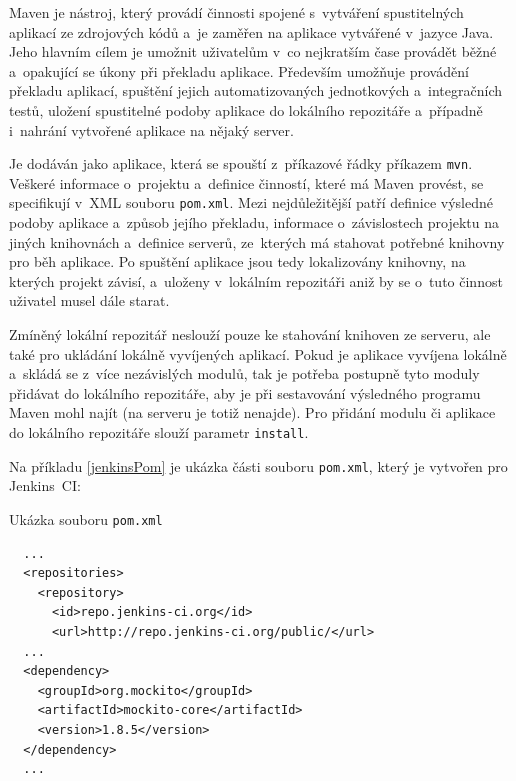         Maven je nástroj, který provádí činnosti spojené s~vytváření spustitelných aplikací ze zdrojových kódů
        a~je zaměřen na aplikace vytvářené v~jazyce Java. Jeho hlavním cílem je umožnit uživatelům v~co nejkratším
        čase provádět běžné a~opakující se úkony při překladu aplikace. Především umožňuje
        provádění překladu aplikací, spuštění jejich automatizovaných jednotkových
        a~integračních testů, uložení spustitelné podoby aplikace do lokálního repozitáře 
        a~případně i~nahrání vytvořené aplikace na nějaký server. 

        Je dodáván jako aplikace, která se spouští z~příkazové řádky příkazem \texttt{mvn}. Veškeré
        informace o~projektu a~definice činností, které má Maven provést, se specifikují
        v~XML souboru \texttt{pom.xml}. Mezi nejdůležitější patří definice výsledné podoby aplikace
        a~způsob jejího překladu, informace o~závislostech
        projektu na jiných knihovnách a~definice serverů, ze~kterých má stahovat potřebné knihovny pro běh aplikace. 
        Po spuštění aplikace jsou tedy lokalizovány knihovny, na kterých projekt
        závisí, a~uloženy v~lokálním repozitáři aniž by se o~tuto činnost uživatel musel dále starat.

        Zmíněný lokální repozitář neslouží pouze ke stahování knihoven ze serveru, ale
        také pro ukládání lokálně vyvíjených aplikací.
        Pokud je aplikace vyvíjena lokálně a~skládá se z~více nezávislých modulů, tak je potřeba
        postupně tyto moduly přidávat do lokálního repozitáře, aby je při sestavování
        výsledného programu Maven mohl najít (na serveru je totiž nenajde). Pro přidání modulu či aplikace do 
        lokálního repozitáře slouží parametr \texttt{install}.


        Na příkladu \ref{jenkinsPom} je ukázka části souboru \texttt{pom.xml}, který je vytvořen pro Jenkins~CI:
        
        \newpage
        \begin{priklad} \label{jenkinsPom} 
            Ukázka souboru \texttt{pom.xml}
\begin{verbatim}
  ...
  <repositories>
    <repository>
      <id>repo.jenkins-ci.org</id>
      <url>http://repo.jenkins-ci.org/public/</url>
  ...
  <dependency>
    <groupId>org.mockito</groupId>
    <artifactId>mockito-core</artifactId>
    <version>1.8.5</version>
  </dependency>
  ...
\end{verbatim}
        \end{priklad}

